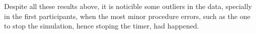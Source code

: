 Despite all these results above, it is noticible some outliers in the data, specially in the first participants, when the most minor procedure errors, such as the one to stop the simulation, hence stoping the timer, had happened.

